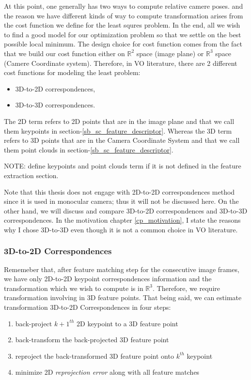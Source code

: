 \documentclass[a4paper]{report}
\numberwithin{figure}{section}
\newcommand{\R}{\mathbb{R}}
\begin{document}
At this point, one generally has two ways to compute relative camere poses.
and the reason we have different kinds of way to compute transformation arises from 
the cost function we define for the least squres problem. In the end, all we wish to 
find a good model for our optimization problem so that we settle on the 
best possible local minimum.
The design choice for cost function comes from the fact that we build 
our cost function either on $\R^2$ space (image plane) or $\R^3$ space 
(Camere Coordinate system).
Therefore, in VO literature, 
there are 2 different cost functions for modeling the least problem:
\begin{itemize}
  \item 3D-to-2D correspondences,
  \item 3D-to-3D correspondences.
\end{itemize}
The 2D term refers to 2D points that are in the image plane and that we call 
them keypoints in section-\ref{sb_sc_feature_descriptor}. 
Whereas the 3D term refers to 3D points that are in the Camera Coordinate 
System and that we call them point clouds in section-\ref{sb_sc_feature_descriptor}.

NOTE: define keypoints and point clouds term if it is not defined in the feature extraction section.

Note that this thesis does not engage with 2D-to-2D correspondences method since it is 
used in monocular camera; thus it will not be discussed here. On the other hand, 
we will discuss and compare 3D-to-2D correspondences and 3D-to-3D correspondences. 
In the motivation chapter \ref{cp_motivation}, 
I state the reasons why I chose 3D-to-3D even though it is not a common choice 
in VO literature.


\subsubsection{3D-to-2D Correspondences}

Rememeber that,
after feature matching step for the consecutive image frames, we have only
2D-to-2D keypoint correspondences information and 
the transformation which we wish to compute is in $\R^3$. Therefore, we require 
transformation involving in 3D feature points.
That being said, we can estimate transformation 3D-to-2D Correspondences in four steps:

\begin{enumerate}
  \item back-project $k+1^{th}$ 2D keypoint to a 3D feature point
  \item back-transform the back-projected 3D feature point
  \item reproject the back-transformed 3D feature point onto $k^{th}$ keypoint
  \item minimize 2D \textit{reprojection error} along with all feature matches
\end{enumerate}
\end{document}
